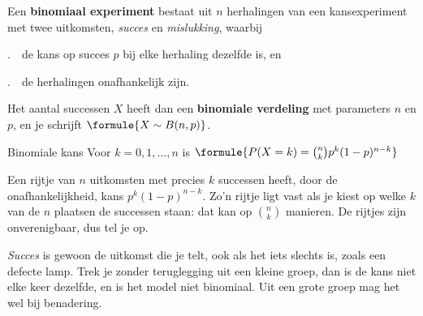 \begin{theorie}
Een \textbf{\textcolor{accent}{binomiaal experiment}} bestaat uit $n$ herhalingen van een kansexperiment met twee uitkomsten, \textit{succes} en \textit{mislukking}, waarbij

\vspace{1mm}
.\ \ de kans op succes $p$ bij elke herhaling dezelfde is, en

.\ \ de herhalingen onafhankelijk zijn.

\vspace{1mm}
Het aantal successen $X$ heeft dan een \textbf{\textcolor{accent}{binomiale verdeling}} met parameters $n$ en $p$, en je schrijft $\formule{X \sim B(n, p)}$.

\begin{stelling}{Binomiale kans}
Voor $k = 0, 1, \ldots, n$ is \quad $\formule{P(X = k) = \binom{n}{k} p^k (1 - p)^{n - k}}$
\end{stelling}

\begin{bewijs}
Een rijtje van $n$ uitkomsten met precies $k$ successen heeft, door de onafhankelijkheid, kans $p^k(1 - p)^{n - k}$. Zo'n rijtje ligt vast als je kiest op welke $k$ van de $n$ plaatsen de successen staan: dat kan op $\binom{n}{k}$ manieren. De rijtjes zijn onverenigbaar, dus tel je op.
\end{bewijs}
\end{theorie}

\textit{Succes} is gewoon de uitkomst die je telt, ook als het iets slechts is, zoals een defecte lamp. Trek je zonder teruglegging uit een kleine groep, dan is de kans niet elke keer dezelfde, en is het model niet binomiaal. Uit een grote groep mag het wel bij benadering.


\begin{oefeningen}
\end{oefeningen}

